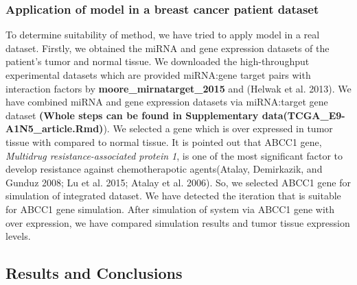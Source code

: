 \documentclass[]{article}
\begin{document}
\hypertarget{application-of-model-in-a-breast-cancer-patient-dataset}{%
\subsubsection{Application of model in a breast cancer patient
dataset}\label{application-of-model-in-a-breast-cancer-patient-dataset}}

To determine suitability of method, we have tried to apply model in a
real dataset. Firstly, we obtained the miRNA and gene expression
datasets of the patient's tumor and normal tissue. We downloaded the
high-throughput experimental datasets which are provided miRNA:gene
target pairs with interaction factors by
\textbf{moore\_mirnatarget\_2015} and (Helwak et al. 2013). We have
combined miRNA and gene expression datasets via miRNA:target gene
dataset \textbf{(Whole steps can be found in Supplementary
data(TCGA\_E9-A1N5\_article.Rmd)}). We selected a gene which is over
expressed in tumor tissue with compared to normal tissue. It is pointed
out that ABCC1 gene, \emph{Multidrug resistance-associated protein 1},
is one of the most significant factor to develop resistance against
chemotherapotic agents(Atalay, Demirkazik, and Gunduz 2008; Lu et al.
2015; Atalay et al. 2006). So, we selected ABCC1 gene for simulation of
integrated dataset. We have detected the iteration that is suitable for
ABCC1 gene simulation. After simulation of system via ABCC1 gene with
over expression, we have compared simulation results and tumor tissue
expression levels.

\hypertarget{results-and-conclusions}{%
\subsection{Results and Conclusions}\label{results-and-conclusions}}
\end{document}

